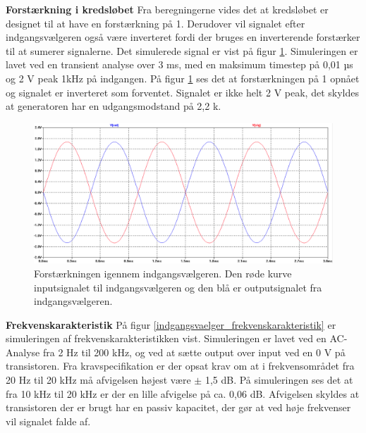 \textbf{Forstærkning i kredsløbet}
\newline
Fra beregningerne vides det at kredsløbet er designet til at have en forstærkning på 1. Derudover vil signalet efter indgangsvælgeren også være inverteret fordi der bruges en inverterende forstærker til at sumerer signalerne. Det simulerede signal er vist på figur \ref{indgangsvaelger_input/output}. Simuleringen er lavet ved en transient analyse over 3 ms, med en maksimum timestep på 0,01 µs og 2 V peak 1kHz på indgangen. På figur \ref{indgangsvaelger_input/output} ses det at forstærkningen på 1 opnået og signalet er inverteret som forventet. Signalet er ikke helt 2 V peak, det skyldes at generatoren har en udgangsmodstand på 2,2 k\ohm.
\begin{figure}[h]
\centering
\includegraphics[scale=0.3]{teknisk/indgangsvaelger/simulering/input_output.png}
\caption{Forstærkningen igennem indgangsvælgeren. Den røde kurve inputsignalet til indgangsvælgeren og den blå er outputsignalet fra indgangsvælgeren.}
\label{indgangsvaelger_input/output}
\end{figure}

\textbf{Frekvenskarakteristik}
\newline
På figur \ref{indgangsvaelger_frekvenskarakteristik} er simuleringen af frekvenskarakteristikken vist. Simuleringen er lavet ved en AC-Analyse fra 2 Hz til 200 kHz, og ved at sætte output over input ved en 0 V på transistoren. Fra kravspecifikation er der opsat krav om at i frekvensområdet fra 20 Hz til 20 kHz må afvigelsen højest være $\pm$ 1,5 dB. På simuleringen ses det at fra 10 kHz til 20 kHz er der en lille afvigelse på ca. 0,06 dB. Afvigelsen skyldes at transistoren der er brugt har en passiv kapacitet, der gør at ved høje frekvenser vil signalet falde af.

